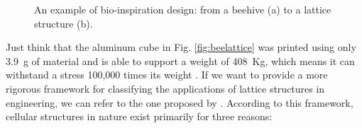 \begin{figure}[H]
    \centering
    \quad
    \caption[Bio-inspiration design.]{An example of bio-inspiration design: from a beehive (a) to a lattice structure (b).}
    \label{fig:bioinsp}
\end{figure}
Just think that the aluminum cube in Fig. \ref{fig:beelattice} was printed using only \SI{3.9}{g} of material and is able to support a weight of \SI{408}{Kg}, which means it can withstand a stress 100,000 times its weight \cite{noauthor_3d_2014}. If we want to provide a more rigorous framework for classifying the applications of lattice structures in engineering, we can refer to the one proposed by \citeauthor{mcnulty_framework_2017}. According to this framework, cellular structures in nature exist primarily for three reasons:
